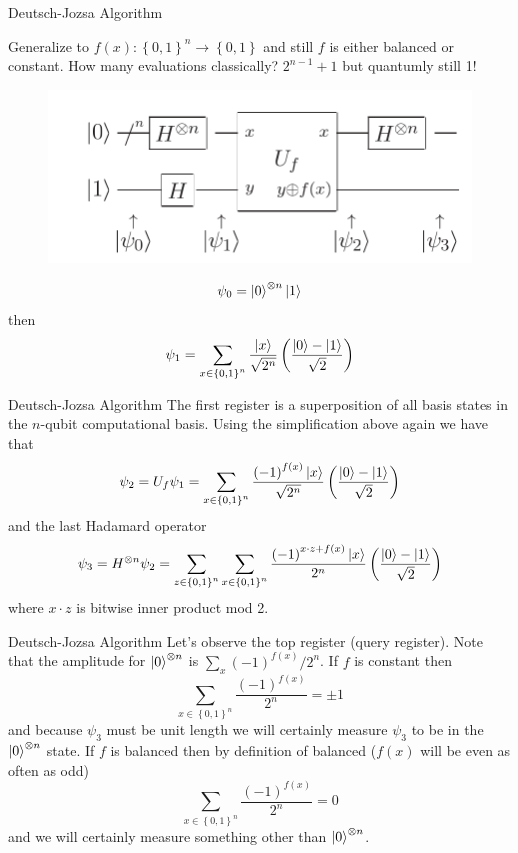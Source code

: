 \documentclass{beamer}
\begin{document}
\begin{frame}{Deutsch-Jozsa Algorithm}

Generalize to $f\left(x\right):\left\{ 0,1\right\} ^{n}\to\left\{ 0,1\right\} $ and still $f$ is either balanced or constant.
How many evaluations classically? $2^{n-1}+1$ but quantumly still 1!
 
\begin{figure}[ht]
  \includegraphics[scale=0.33]{pasted2}
\end{figure}

\[
\psi_{0}=\Ket{0}^{\otimes n}\Ket{1}
\]
 then 
\[
\psi_{1}=\sum_{x\in\left\{ 0,1\right\} ^{n}}\frac{\Ket{x}}{\sqrt{2^{n}}}\left(\frac{\Ket{0}-\Ket{1}}{\sqrt{2}}\right)
\]

\end{frame}

\begin{frame}{Deutsch-Jozsa Algorithm}
The first register is a superposition of all basis states in the $n$-qubit
computational basis. Using the simplification above again we have
that 
\[
\psi_{2}=U_{f}\psi_{1}=\sum_{x\in\left\{ 0,1\right\} ^{n}}\frac{\left(-1\right)^{f\left(x\right)}\Ket{x}}{\sqrt{2^{n}}}\left(\frac{\Ket{0}-\Ket{1}}{\sqrt{2}}\right)
\]
and the last Hadamard operator 
\[
\psi_{3}=H^{\otimes n}\psi_{2}=\sum_{z\in\left\{ 0,1\right\} ^{n}}\sum_{x\in\left\{ 0,1\right\} ^{n}}\frac{\left(-1\right)^{x\cdot z+f\left(x\right)}\Ket{x}}{2^{n}}\left(\frac{\Ket{0}-\Ket{1}}{\sqrt{2}}\right)
\]
where $x\cdot z$ is bitwise inner product mod 2.  
\end{frame}

\begin{frame}{Deutsch-Jozsa Algorithm}
Let's observe the
top register (query register). Note that the amplitude for $\Ket{0}^{\otimes n}$
is $\sum_{x}\left(-1\right)^{f\left(x\right)}/2^{n}$. If $f$ is
constant then
\[
\sum_{x\in\left\{ 0,1\right\} ^{n}}\frac{\left(-1\right)^{f\left(x\right)}}{2^{n}}=\pm1
\]
and because $\psi_{3}$ must be unit length we will certainly measure
$\psi_{3}$ to be in the $\Ket{0}^{\otimes n}$ state. If $f$ is
balanced then by definition of balanced ($f\left(x\right)$ will be
even as often as odd) 
\[
\sum_{x\in\left\{ 0,1\right\} ^{n}}\frac{\left(-1\right)^{f\left(x\right)}}{2^{n}}=0
\]
and we will certainly measure something other than $\Ket{0}^{\otimes n}$.
\end{frame}
\end{document}
